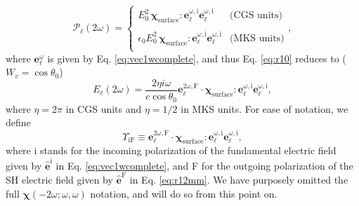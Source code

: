 \documentclass[aps,pra,10pt,amsmath,notitlepage,letterpaper]{revtex4-1}
\begin{document}
\begin{equation}\label{eq:m4}
\boldsymbol{\mathcal{P}}_{\ell}(2\omega) = 
\left\{
\begin{array}{cc}  
E^{2}_{0}\,
\boldsymbol{\chi}_{\mathrm{surface}}:\mathbf{e}^{\omega,\mathrm{i}}_{\ell}
                                     \mathbf{e}^{\omega,\mathrm{i}}_{\ell}
& \text{(CGS units)}\\\\
\epsilon_{0}E^{2}_{0}\,
\boldsymbol{\chi}_{\mathrm{surface}}:\mathbf{e}^{\omega,\mathrm{i}}_{\ell}
                                     \mathbf{e}^{\omega,\mathrm{i}}_{\ell}
& \text{(MKS units)}\\
\end{array}
\right.,
\end{equation}
where $\mathbf{e}^{\omega}_{\ell}$ is given by Eq. \eqref{eq:vec1wcomplete},
and thus Eq. \eqref{eq:r10} reduces to ($W_{v}=\cos\theta_{0}$)
\begin{equation}\label{eq:mr10}
E_{\ell}(2\omega) 
= \frac{2\eta i \omega}{c\cos\theta_{0}}
\mathbf{e}^{2\omega,\mathrm{F}}_{\ell}\cdot
\boldsymbol{\chi}_{\mathrm{surface}}:\mathbf{e}^{\omega,\mathrm{i}}_{\ell}
                                     \mathbf{e}^{\omega,\mathrm{i}}_{\ell},
\end{equation}
where $\eta=2\pi$ in CGS units and $\eta=1/2$ in MKS units. For ease of
notation, we define
\begin{equation}\label{eq:mc0}
\Upsilon_{\mathrm{iF}}
\equiv 
\mathbf{e}^{2\omega,\mathrm{F}}_{\ell}\cdot
\boldsymbol{\chi}_{\mathrm{surface}}:\mathbf{e}^{\omega,\mathrm{i}}_{\ell}
                                     \mathbf{e}^{\omega,\mathrm{i}}_{\ell},
\end{equation}
where i stands for the incoming polarization of the fundamental electric field
given by $\hat{\mathbf{e}}^{\mathrm{i}}$ in Eq. \eqref{eq:vec1wcomplete}, and F
for the outgoing polarization of the SH electric field given by
$\hat{\mathbf{e}}^{\mathrm{F}}$ in Eq. \eqref{eq:r12mm}. We have purposely
omitted the full $\boldsymbol{\chi}(-2\omega;\omega,\omega)$ notation, and will
do so from this point on.
\end{document}
